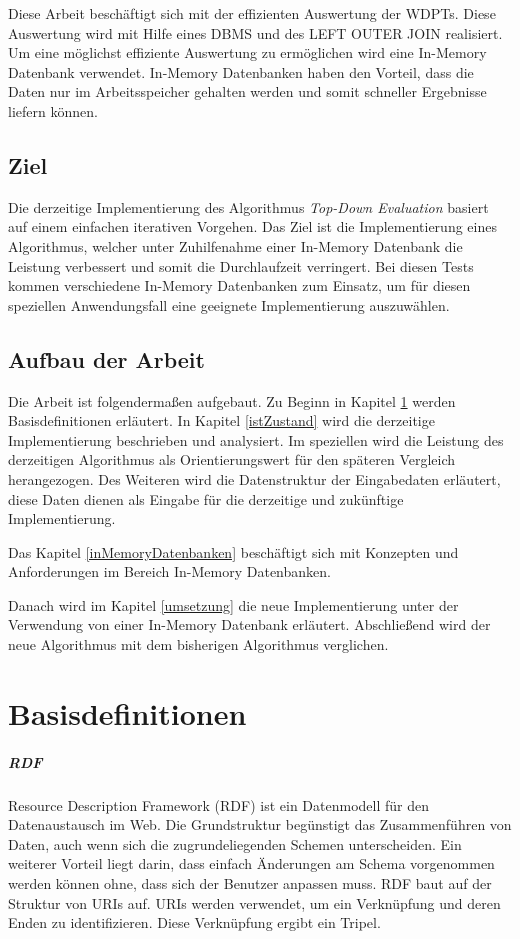\documentclass[draft,final]{vutinfth} %
\begin{document}
Diese Arbeit beschäftigt sich mit der effizienten Auswertung der WDPTs. Diese Auswertung wird mit Hilfe eines DBMS und des LEFT OUTER JOIN realisiert. Um eine möglichst effiziente Auswertung zu ermöglichen wird eine In-Memory Datenbank verwendet. In-Memory Datenbanken haben den Vorteil, dass die Daten nur im Arbeitsspeicher gehalten werden und somit schneller Ergebnisse liefern können. 

\section*{Ziel}
Die derzeitige Implementierung \cite{OptMat} des Algorithmus \textit{Top-Down Evaluation} \cite{LPPS2013} basiert auf einem einfachen iterativen Vorgehen. Das Ziel ist die Implementierung eines Algorithmus, welcher unter Zuhilfenahme einer In-Memory Datenbank die Leistung verbessert und somit die Durchlaufzeit verringert. Bei diesen Tests kommen verschiedene In-Memory Datenbanken zum Einsatz, um für diesen speziellen Anwendungsfall eine geeignete Implementierung auszuwählen.

\section*{Aufbau der Arbeit}
Die Arbeit ist folgenderma{\ss}en aufgebaut. Zu Beginn in Kapitel \ref{basisdef} werden Basisdefinitionen erläutert. In Kapitel \ref{istZustand} wird die derzeitige Implementierung beschrieben und analysiert. Im speziellen wird die Leistung des derzeitigen Algorithmus als Orientierungswert für den späteren Vergleich herangezogen. Des Weiteren wird die Datenstruktur der Eingabedaten erläutert, diese Daten dienen als Eingabe für die derzeitige und zukünftige Implementierung.

Das Kapitel \ref{inMemoryDatenbanken} beschäftigt sich mit Konzepten und Anforderungen im Bereich In-Memory Datenbanken. 

Danach wird im Kapitel \ref{umsetzung} die neue Implementierung unter der Verwendung von einer In-Memory Datenbank erläutert. Abschlie{\ss}end wird der neue Algorithmus mit dem bisherigen Algorithmus verglichen.

\chapter{Basisdefinitionen} \label{basisdef}
\paragraph{RDF}
Resource Description Framework (RDF) ist ein Datenmodell für den Datenaustausch im Web. Die Grundstruktur begünstigt das Zusammenführen von Daten, auch wenn sich die zugrundeliegenden Schemen unterscheiden. Ein weiterer Vorteil liegt darin, dass einfach Änderungen am Schema vorgenommen werden können ohne, dass sich der Benutzer anpassen muss. RDF baut auf der Struktur von URIs auf. URIs werden verwendet, um ein Verknüpfung und deren Enden zu identifizieren. Diese Verknüpfung ergibt ein Tripel.
\end{document}
